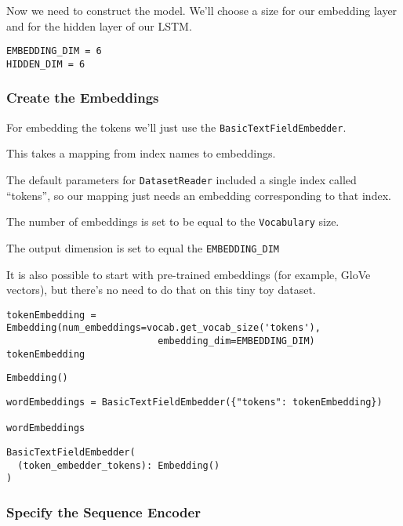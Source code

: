 \documentclass[
]{article}
\begin{document}
Now we need to construct the model. We'll choose a size for our
embedding layer and for the hidden layer of our LSTM.

\begin{verbatim}
EMBEDDING_DIM = 6
HIDDEN_DIM = 6
\end{verbatim}

\hypertarget{create-the-embeddings}{%
\subsubsection{Create the Embeddings}\label{create-the-embeddings}}

For embedding the tokens we'll just use the
\texttt{BasicTextFieldEmbedder}.

This takes a mapping from index names to embeddings.

The default parameters for \texttt{DatasetReader} included a single
index called ``tokens'', so our mapping just needs an embedding
corresponding to that index.

The number of embeddings is set to be equal to the \texttt{Vocabulary}
size.

The output dimension is set to equal the \texttt{EMBEDDING\_DIM}

It is also possible to start with pre-trained embeddings (for example,
GloVe vectors), but there's no need to do that on this tiny toy dataset.

\begin{verbatim}
tokenEmbedding = Embedding(num_embeddings=vocab.get_vocab_size('tokens'),
                           embedding_dim=EMBEDDING_DIM)
tokenEmbedding
\end{verbatim}

\begin{verbatim}
Embedding()
\end{verbatim}

\begin{verbatim}
wordEmbeddings = BasicTextFieldEmbedder({"tokens": tokenEmbedding})

wordEmbeddings
\end{verbatim}

\begin{verbatim}
BasicTextFieldEmbedder(
  (token_embedder_tokens): Embedding()
)
\end{verbatim}

\hypertarget{specify-the-sequence-encoder}{%
\subsubsection{Specify the Sequence
Encoder}\label{specify-the-sequence-encoder}}
\end{document}
